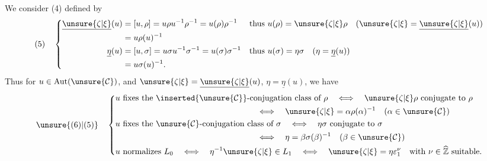 We  consider
\hfill(4)
defined by
\[
(5)\quad
\left\{\begin{aligned}
\underline{\unsure{\zeta|\xi}}(u)&=[u,\rho]=u\rho u^{-1}\rho^{-1}=u(\rho)\rho^{-1}
&&\text{thus }u(\rho)=\unsure{\zeta|\xi}\rho\quad(\unsure{\zeta|\xi}=\underline{\unsure{\zeta|\xi}}(u))\\
&=u\rho(u)^{-1}\\
\underline{\eta}(u)&=[u,\sigma]=u\sigma u^{-1}\sigma^{-1}=u(\sigma)\sigma^{-1}
&&\text{thus }u(\sigma)=\eta\sigma\quad(\eta=\underline{\eta}(u))\\
&=u\sigma(u)^{-1}.
\end{aligned}\right.
\]
Thus for $u\in\mathrm{Aut}(\unsure{\mathcal{C}})$, and $\unsure{\zeta|\xi}=\underline{\unsure{\zeta|\xi}}(u)$, $\eta=\underline{\eta}(u)$, we have
\[
\unsure{(6)|(5)}\quad
\left\{\begin{aligned}
&u\text{ fixes the }\inserted{\unsure{\mathcal{C}}}\text{-conjugation class of }\rho
\quad\Longleftrightarrow\quad \unsure{\zeta|\xi}\rho\text{ conjugate to }\rho\\
&\hspace{6cm}\Longleftrightarrow\quad\unsure{\zeta|\xi}=\alpha\rho(\alpha)^{-1}\quad(\alpha\in\unsure{\mathcal{C}})\\
&u\text{ fixes the }\unsure{\mathcal{C}}\text{-conjugation class of }\sigma
\quad\Longleftrightarrow\quad \eta\sigma\text{ conjugate to }\sigma\\
&\hspace{6cm}\Longleftrightarrow\quad\eta=\beta\sigma(\beta)^{-1}\quad(\beta\in\unsure{\mathcal{C}})\\
&u\text{ normalizes }L_0\quad\Longleftrightarrow\quad\eta^{-1}\unsure{\zeta|\xi}\in L_1
\quad\Longleftrightarrow\quad\unsure{\zeta|\xi}=\eta\varepsilon_1^\nu\quad\text{with }\nu\in\widehat{\mathbb Z}\text{ suitable}.
\end{aligned}\right.
\]

